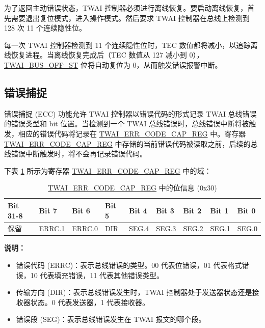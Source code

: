 \documentclass[main\_\_CN.tex]{subfiles}
\begin{document}
为了返回主动错误状态，TWAI 控制器必须进行离线恢复。要启动离线恢复，首先需要退出复位模式，进入操作模式。然后要求 TWAI 控制器在总线上检测到 128 次 11 个连续隐性位。

每一次 TWAI 控制器检测到 11 个连续隐性位时，TEC 数值都将减小，以追踪离线恢复进程。当离线恢复完成后（TEC 数值从 127 减小到 0），\hyperref[fielddesc:TWAIBUSOFFST]{TWAI\_BUS\_OFF\_ST} 位将自动复位为 0，从而触发错误报警中断。

\subsection{错误捕捉}

错误捕捉 (ECC) 功能允许 TWAI 控制器以错误代码的形式记录 TWAI 总线错误的错误类型和 bit 位置。当检测到一个 TWAI 总线错误时，总线错误中断将被触发，相应的错误代码将记录在 \hyperref[regdesc:TWAIERRCODECAPREG]{TWAI\_ERR\_CODE\_CAP\_REG} 中。寄存器 \hyperref[regdesc:TWAIERRCODECAPREG]{TWAI\_ERR\_CODE\_CAP\_REG} 中存储的当前错误代码被读取之前，后续的总线错误中断触发时，将不会再记录错误代码。

下表 \ref{tab:twai-bit-info-error-code-cap-reg-reg-cn} 所示为寄存器 \hyperref[regdesc:TWAIERRCODECAPREG]{TWAI\_ERR\_CODE\_CAP\_REG} 中的域：

\begin{longtable}[c]{|p{1.4cm}|p{1.4cm}|p{1.4cm}|p{1.4cm}|p{1.4cm}|p{1.4cm}|p{1.4cm}|p{1.4cm}|p{1.4cm}|}
    \caption{\hyperref[regdesc:TWAIERRCODECAPREG]{TWAI\_ERR\_CODE\_CAP\_REG} 中的位信息 (0x30)}
    \label{tab:twai-bit-info-error-code-cap-reg-reg-cn}\\
    \hline
    \rowcolor{lightgray}
    \textbf{Bit 31-8} & \textbf{Bit 7} & \textbf{Bit 6} & \textbf{Bit 5} & \textbf{Bit 4} & \textbf{Bit 3} & \textbf{Bit 2} & \textbf{Bit 1} & \textbf{Bit 0}\\\hline
    保留 & ERRC.1 & ERRC.0 & DIR & SEG.4 & SEG.3 & SEG.2 & SEG.1 & SEG.0\\
    \hline
\end{longtable}
\vspace{-1.5em}
{\bfseries 说明：}\\
\begin{itemize}
    \item 错误代码 (ERRC)：表示总线错误的类型。00 代表位错误，01 代表格式错误，10 代表填充错误，11 代表其他错误类型。
    \item 传输方向 (DIR)：表示总线错误发生时，TWAI 控制器处于发送器状态还是接收器状态。0 代表发送器，1 代表接收器。
    \item 错误段 (SEG)：表示总线错误发生在 TWAI 报文的哪个段。
\end{itemize}
\end{document}
